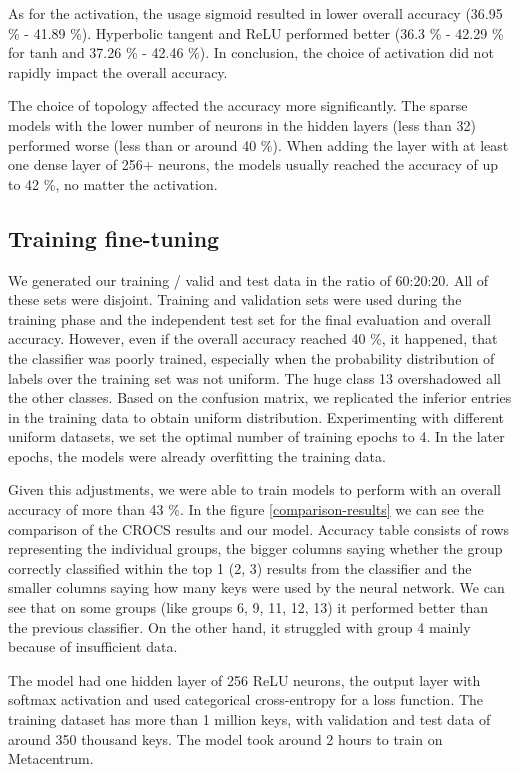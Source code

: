 As for the activation, the usage sigmoid resulted in lower overall accuracy (36.95 \% - 41.89 \%). Hyperbolic tangent and ReLU performed better (36.3 \% - 42.29 \% for tanh and 37.26 \% - 42.46 \%). In conclusion, the choice of activation did not rapidly impact the overall accuracy. 

The choice of topology affected the accuracy more significantly. The sparse models with the lower number of neurons in the hidden layers (less than 32) performed worse (less than or around 40 \%). When adding the layer with at least one dense layer of 256+ neurons, the models usually reached the accuracy of up to 42 \%, no matter the activation.

\subsection*{Training fine-tuning}

We generated our training / valid and test data in the ratio of 60:20:20. All of these sets were disjoint. Training and validation sets were used during the training phase and the independent test set for the final evaluation and overall accuracy. However, even if the overall accuracy reached 40 \%, it happened, that the classifier was poorly trained, especially when the probability distribution of labels over the training set was not uniform. The huge class 13 overshadowed all the other classes. Based on the confusion matrix, we replicated the inferior entries in the training data to obtain uniform distribution. Experimenting with different uniform datasets, we set the optimal number of training epochs to 4. In the later epochs, the models were already overfitting the training data.

Given this adjustments, we were able to train models to perform with an overall accuracy of more than 43 \%. In the figure \ref{comparison-results} we can see the comparison of the CROCS results and our model. Accuracy table consists of rows representing the individual groups, the bigger columns saying whether the group correctly classified within the top 1 (2, 3) results from the classifier and the smaller columns saying how many keys were used by the neural network. We can see that on some groups (like groups 6, 9, 11, 12, 13) it performed better than the previous classifier. On the other hand, it struggled with group 4 mainly because of insufficient data.

The model had one hidden layer of 256 ReLU neurons, the output layer with softmax activation and used categorical cross-entropy for a loss function. The training dataset has more than 1 million keys, with validation and test data of around 350 thousand keys. The model took around 2 hours to train on Metacentrum.

